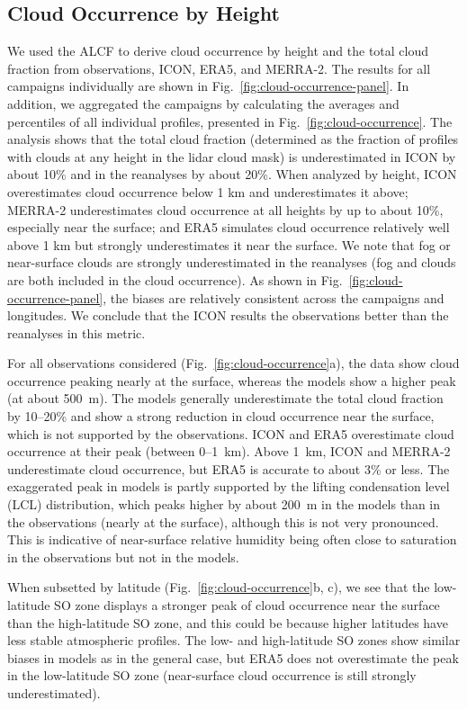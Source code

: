 \documentclass[draft]{agujournal2019}
\begin{document}
\subsection{Cloud Occurrence by Height}
\label{sec:cloud-occurrence}

We used the ALCF to derive cloud occurrence by height and the total cloud fraction from observations, ICON, ERA5, and MERRA-2. The results for all campaigns individually are shown in Fig.~\ref{fig:cloud-occurrence-panel}. In addition, we aggregated the campaigns by calculating the averages and percentiles of all individual profiles, presented in Fig.~\ref{fig:cloud-occurrence}. The analysis shows that the total cloud fraction (determined as the fraction of profiles with clouds at any height in the lidar cloud mask) is underestimated in ICON by about 10\% and in the reanalyses by about 20\%. When analyzed by height, ICON overestimates cloud occurrence below 1 km and underestimates it above; MERRA-2 underestimates cloud occurrence at all heights by up to about 10\%, especially near the surface; and ERA5 simulates cloud occurrence relatively well above 1 km but strongly underestimates it near the surface. We note that fog or near-surface clouds are strongly underestimated in the reanalyses (fog and clouds are both included in the cloud occurrence). As shown in Fig.~\ref{fig:cloud-occurrence-panel}, the biases are relatively consistent across the campaigns and longitudes. We conclude that the ICON results the observations better than the reanalyses in this metric.

For all observations considered (Fig.~\ref{fig:cloud-occurrence}a), the data show cloud occurrence peaking nearly at the surface, whereas the models show a higher peak (at about 500~m). The models generally underestimate the total cloud fraction by 10--20\% and show a strong reduction in cloud occurrence near the surface, which is not supported by the observations. ICON and ERA5 overestimate cloud occurrence at their peak (between 0--1~km). Above 1~km, ICON and MERRA-2 underestimate cloud occurrence, but ERA5 is accurate to about 3\% or less. The exaggerated peak in models is partly supported by the lifting condensation level (LCL) distribution, which peaks higher by about 200~m in the models than in the observations (nearly at the surface), although this is not very pronounced. This is indicative of near-surface relative humidity being often close to saturation in the observations but not in the models.

When subsetted by latitude (Fig.~\ref{fig:cloud-occurrence}b, c), we see that the low-latitude SO zone displays a stronger peak of cloud occurrence near the surface than the high-latitude SO zone, and this could be because higher latitudes have less stable atmospheric profiles. The low- and high-latitude SO zones show similar biases in models as in the general case, but ERA5 does not overestimate the peak in the low-latitude SO zone (near-surface cloud occurrence is still strongly underestimated).
\end{document}
